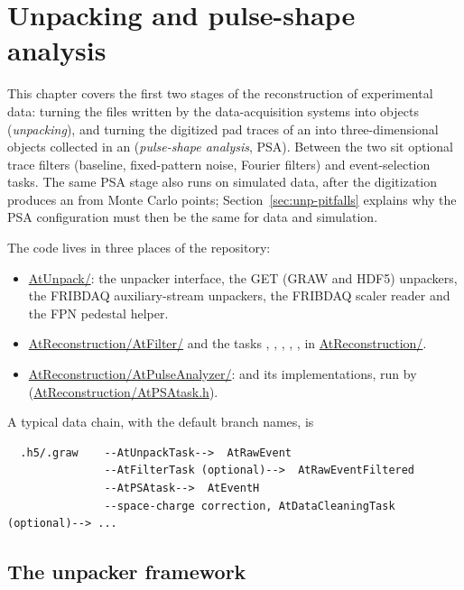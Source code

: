 \chapter{Unpacking and pulse-shape analysis}
\label{ch:unpacking}

This chapter covers the first two stages of the reconstruction of experimental data: turning the
files written by the data-acquisition systems into  objects (\emph{unpacking}), and
turning the digitized pad traces of an  into three-dimensional  objects
collected in an  (\emph{pulse-shape analysis}, PSA). Between the two sit optional
trace filters (baseline, fixed-pattern noise, Fourier filters) and event-selection tasks. The same
PSA stage also runs on simulated data, after the digitization produces an  from
Monte Carlo points; Section~\ref{sec:unp-pitfalls} explains why the PSA configuration must then be
the same for data and simulation.

The code lives in three places of the repository:
\begin{itemize}
  \item \url{AtUnpack/}: the unpacker interface, the GET (GRAW and HDF5) unpackers, the FRIBDAQ
        auxiliary-stream unpackers, the FRIBDAQ scaler reader and the FPN pedestal helper.
  \item \url{AtReconstruction/AtFilter/} and the tasks , ,
        , , ,
         in \url{AtReconstruction/}.
  \item \url{AtReconstruction/AtPulseAnalyzer/}:  and its implementations, run by
         (\url{AtReconstruction/AtPSAtask.h}).
\end{itemize}

A typical data chain, with the default branch names, is
\begin{verbatim}
  .h5/.graw    --AtUnpackTask-->  AtRawEvent
               --AtFilterTask (optional)-->  AtRawEventFiltered
               --AtPSAtask-->  AtEventH
               --space-charge correction, AtDataCleaningTask (optional)--> ...
\end{verbatim}

\section{The unpacker framework}
\label{sec:unp-framework}

